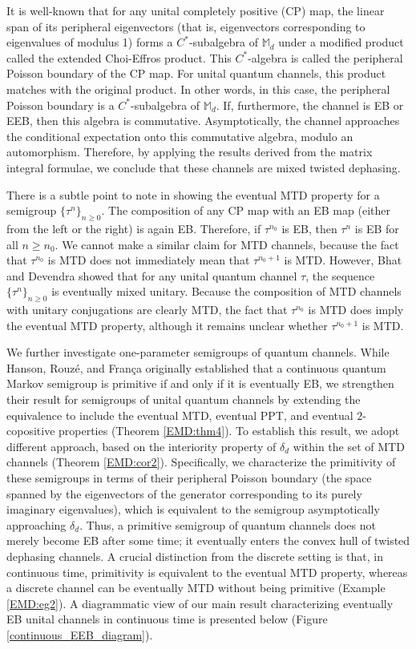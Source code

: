 \documentclass[11pt,reqno]{amsart}
\theoremstyle{definition}
\theoremstyle{plain}
\theoremstyle{remark}
\numberwithin{equation}{section}%
\begin{document}
It is well-known that for any unital completely positive (CP) map, the linear span of its peripheral eigenvectors (that is, eigenvectors corresponding to eigenvalues of modulus 1) forms a $C^*$-subalgebra of $\mathbb{M}_d$ under a modified product called the extended Choi-Effros product. This $C^*$-algebra is called the peripheral Poisson boundary of the CP map. For unital quantum channels, this product matches with the original product. In other words, in this case, the peripheral Poisson boundary is a $C^*$-subalgebra of $\mathbb{M}_d$. If, furthermore, the channel is EB or EEB,  then this algebra is commutative. Asymptotically, the channel approaches the conditional expectation onto this commutative algebra, modulo an automorphism. Therefore, by applying the results derived from the matrix integral formulae, we conclude that these channels are mixed twisted dephasing. 

There is a subtle point to note in showing the eventual MTD property for a semigroup $\{\tau ^n\}_{n\geq 0}$. The composition of any CP map with an EB map (either from the left or the right) is again EB. Therefore, if $\tau ^{n_0}$ is EB, then $\tau ^n$ is EB for all $n\geq n_0.$ We cannot make a similar claim for MTD channels, because the fact that $\tau ^{n_0}$ is MTD does not immediately mean that $\tau ^{n_0+1}$ is MTD. However, Bhat and Devendra \cite{BD} showed that for any unital quantum channel $\tau $, the sequence $\{\tau ^n\}_{n\geq 0}$ is eventually mixed unitary. Because the composition of MTD channels with unitary conjugations are clearly MTD, the fact that $\tau^{n_0}$ is MTD does imply the eventual MTD property, although it remains unclear whether $\tau^{n_0+1}$ is MTD. 

We further investigate one-parameter semigroups of quantum channels. While Hanson, Rouz\'e, and Fran\c ca \cite{HRS} originally established that a continuous quantum Markov semigroup is primitive if and only if it is eventually EB, we strengthen their result for semigroups of unital quantum channels by extending the equivalence to include the eventual MTD, eventual PPT, and eventual $2$-copositive properties (Theorem \ref{EMD:thm4}). To establish this result, we adopt different approach, based on the interiority property of $\delta_d$ within the set of MTD channels (Theorem \ref{EMD:cor2}). Specifically, we characterize the primitivity of these semigroups in terms of their peripheral Poisson boundary (the space spanned by the eigenvectors of the generator corresponding to its purely imaginary eigenvalues), which is equivalent to the semigroup asymptotically approaching $\delta_d$. Thus, a primitive semigroup of quantum channels does not merely become EB after some time; it eventually enters the convex hull of twisted dephasing channels. A crucial distinction from the discrete setting is that, in continuous time, primitivity is equivalent to the eventual MTD property, whereas a discrete channel can be eventually MTD without being primitive (Example \ref{EMD:eg2}). A diagrammatic view of our main result characterizing eventually EB unital channels in continuous time is presented below (Figure \ref{continuous_EEB_diagram}).
\end{document}
